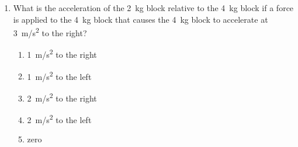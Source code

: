 \documentclass{../../oss-apphys}
\begin{document}
\begin{multicols}{2}
\begin{enumerate}[resume,leftmargin=18pt]
  \item What is the acceleration of the \SI{2}{\kilo\gram} block relative to the
    \SI{4}{\kilo\gram} block if a force is applied to the \SI{4}{\kilo\gram}
    block that causes the \SI{4}{\kilo\gram} block to accelerate at
    \SI{3}{m/s^2} to the right?
    \begin{enumerate}[noitemsep,topsep=0pt,leftmargin=18pt,label=(\Alph*)]
    \item\SI{1}{m/s^2} to the right
    \item\SI{1}{m/s^2} to the left
    \item\SI{2}{m/s^2} to the right
    \item\SI{2}{m/s^2} to the left
    \item zero
    \end{enumerate}
    \label{stacked2}
  \end{enumerate}
\end{multicols}
\end{document}
